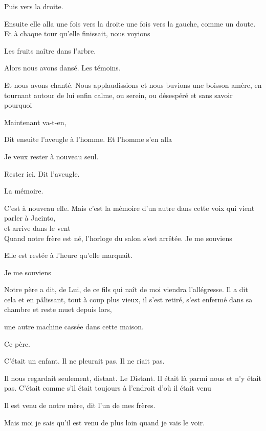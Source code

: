 Puis vers la droite.

Ensuite elle alla une fois vers la droite une fois vers la gauche, comme
un doute. Et à chaque tour qu'elle finissait, nous voyions

Les fruits naître dans l'arbre.

Alors nous avons dansé. Les témoins.

Et nous avons chanté. Nous applaudissions et nous buvions une boisson
amère, en tournant autour de lui enfin calme, ou serein, ou désespéré et
sans savoir pourquoi

\pagebreak

\vspace*{4cm}

Maintenant va-t-en,

Dit ensuite l'aveugle à l'homme. Et l'homme s'en alla

Je veux rester à nouveau seul.

Rester ici. Dit l'aveugle.

\pagebreak

\vspace*{4cm}

La mémoire.

C'est à nouveau elle. Mais c'est la mémoire d'un autre dans cette voix
qui vient parler à Jacinto,\\

et arrive dans le vent\\

Quand notre frère est né, l'horloge du salon s'est arrêtée. Je me
souviens

Elle est restée à l'heure qu'elle marquait.

Je me souviens

Notre père a dit, de Lui, de ce fils qui naît de moi viendra
l'allégresse. Il a dit cela et en pâlissant, tout à coup plus vieux, il
s'est retiré, s'est enfermé dans sa chambre et reste muet depuis lors,

une autre machine cassée dans cette maison.

Ce père.

C'était un enfant. Il ne pleurait pas. Il ne riait pas.

Il nous regardait seulement, distant. Le Distant. Il était là parmi nous
et n'y était pas. C'était comme s'il était toujours à l'endroit d'où il
était venu

Il est venu de notre mère, dit l'un de mes frères.

Mais moi je sais qu'il est venu de plus loin quand je vais le voir.

